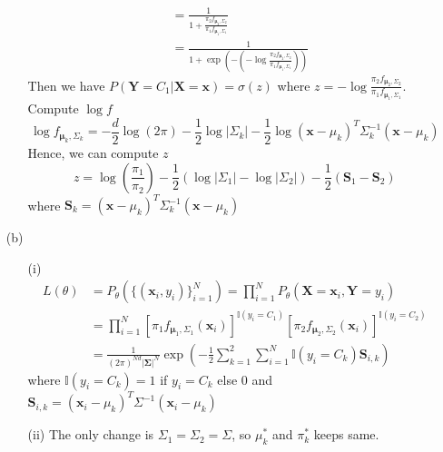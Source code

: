 \documentclass[12pt,a4paper]{article}
\begin{document}
\begin{enumerate}
\begin{enumerate}
\begin{align*}
                        &= \frac{1}{1+\frac{\pi_{2}f_{\mathbf{\mu}_{2}, \Sigma_{2}}}{\pi_{1}f_{\mathbf{\mu}_{1}, \Sigma_{1}}}}\\
                        &= \frac{1}{1+\exp(-(-\log\frac{\pi_{2}f_{\mathbf{\mu}_{2}, \Sigma_{2}}}{\pi_{1}f_{\mathbf{\mu}_{1}, \Sigma_{1}}}))}
                \end{align*}
                Then we have $P(\mathbf{Y}=C_{1}|\mathbf{X}=\mathbf{x}) = \sigma(z)$ where $z=-\log\frac{\pi_{2}f_{\mathbf{\mu}_{2}, \Sigma_{2}}}{\pi_{1}f_{\mathbf{\mu}_{1}, \Sigma_{1}}}$.
                Compute $\log f$
                \[
                    \log f_{\mathbf{\mu}_{k}, \Sigma_{k}} = -\frac{d}{2}\log(2\pi) -\frac{1}{2}\log |\Sigma_{k}| - \frac{1}{2}\log (\mathbf{x}-\mu_{k})^T\Sigma_{k}^{-1}(\mathbf{x}-\mu_{k})
                \]
                Hence, we can compute $z$
                \[
                    z = \log(\frac{\pi_{1}}{\pi_{2}}) -\frac{1}{2}(\log|\Sigma_{1}| - \log|\Sigma_{2}|) - \frac{1}{2} (\mathbf{S}_{1} - \mathbf{S}_{2}) 
                \]
                where $\mathbf{S}_{k} = (\mathbf{x}-\mu_{k})^T\Sigma_{k}^{-1}(\mathbf{x}-\mu_{k})$
        \end{enumerate}
    \item[(b)]
        \begin{enumerate}
            \item [(i)]
                \begin{align*}
                    L(\theta) 
                        &= P_{\theta}(\{(\mathbf{x}_{i}, y_{i})\}_{i=1}^{N}) = \prod_{i=1}^{N} P_{\theta}(\mathbf{X}=\mathbf{x}_{i}, \mathbf{Y}=y_{i})\\
                        &= \prod_{i=1}^{N} [\pi_{1}f_{\mathbf{\mu}_{1}, \Sigma_{1}}(\mathbf{x}_{i})]^{\mathbb{I} (y_{i}=C_{1})} [\pi_{2}f_{\mathbf{\mu}_{2}, \Sigma_{2}}(\mathbf{x}_{i})]^{\mathbb{I} (y_{i}=C_{2})}\\
                        &= \frac{1}{(2\pi)^{Nd} |\boldsymbol{\Sigma}|^{N}}\exp\left(-\frac{1}{2}\sum_{k=1}^{2}\sum_{i=1}^{N}\mathbb{I} (y_{i}=C_{k})\mathbf{S}_{i,k}\right)
                \end{align*}
                where $\mathbb{I} (y_{i}=C_{k}) = 1$ if $y_{i}=C_{k}$ else 0 and $\mathbf{S}_{i, k} = (\mathbf{x}_{i}-\mu_{k})^T\Sigma^{-1}(\mathbf{x}_{i}-\mu_{k})$
            \item [(ii)]
                The only change is $\Sigma_{1} = \Sigma_{2} = \Sigma$, so $\mu_{k}^{*}$ and $\pi_{k}^{*}$ keeps same.


\end{enumerate}
\end{enumerate}
\end{document}
